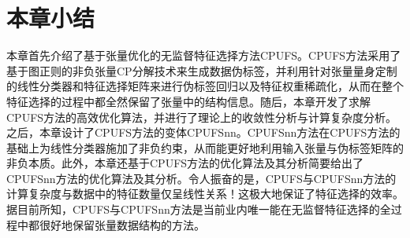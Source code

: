 \section{本章小结}
本章首先介绍了基于张量优化的无监督特征选择方法CPUFS。CPUFS方法采用了基于图正则的非负张量CP分解技术来生成数据伪标签，并利用针对张量量身定制的线性分类器和特征选择矩阵来进行伪标签回归以及特征权重稀疏化，从而在整个特征选择的过程中都全然保留了张量中的结构信息。随后，本章开发了求解CPUFS方法的高效优化算法，并进行了理论上的收敛性分析与计算复杂度分析。之后，本章设计了CPUFS方法的变体CPUFSnn。CPUFSnn方法在CPUFS方法的基础上为线性分类器施加了非负约束，从而能更好地利用输入张量与伪标签矩阵的非负本质。此外，本章还基于CPUFS方法的优化算法及其分析简要给出了CPUFSnn方法的优化算法及其分析。令人振奋的是，CPUFS与CPUFSnn方法的计算复杂度与数据中的特征数量仅呈线性关系！这极大地保证了特征选择的效率。据目前所知，CPUFS与CPUFSnn方法是当前业内唯一能在无监督特征选择的全过程中都很好地保留张量数据结构的方法。

